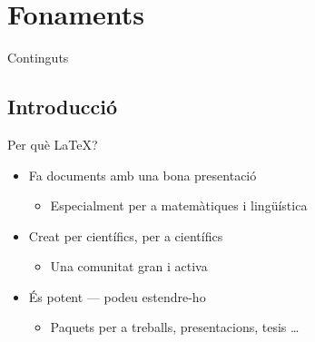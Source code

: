
\date{3 de maig de 2024}

\subtitle{Primera part}



\begin{frame}
\titlepage
\end{frame}

\section{Fonaments}

\begin{frame}{Continguts}
\tableofcontents[currentsection]
\end{frame}

\subsection{Introducció}

\begin{frame}{Per què \LaTeX{}?}
\begin{itemize}
\item Fa documents amb una bona presentació
\begin{itemize}
\item Especialment per a matemàtiques i lingüística
\end{itemize}
%
\item Creat per científics, per a científics
\begin{itemize}
\item Una comunitat gran i activa
\end{itemize}
%
\item És potent --- podeu estendre-ho
\begin{itemize}
\item Paquets per a treballs, presentacions, tesis \dots
\end{itemize}
\end{itemize}
\end{frame}

